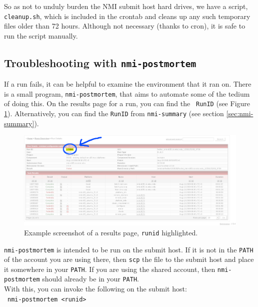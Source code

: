 So as not to unduly burden the NMI submit host hard drives, we have a script,
{\tt cleanup.sh}, which is included in the crontab and cleans up any such
temporary files older than 72 hours.  Although not necessary (thanks to cron),
it is safe to run the script manually.


\subsection{Troubleshooting with {\tt nmi-postmortem}}

If a run fails, it can be helpful to examine the environment that it ran on.
There is a small program, {\tt nmi-postmortem}, that aims to automate some of
the tedium of doing this.  On the results page for a run, you can find the {\tt
RunID} (see Figure \ref{fig:nmi:screenshot}).  Alternatively, you can find the
{\tt RunID} from {\tt nmi-summary} (see section \ref{sec:nmi-summary}).\\


\begin{figure}
	\includegraphics[width=200mm]{nmi-screenshot.png}

	\caption{Example screenshot of a results page, {\tt runid} highlighted.}
	\label{fig:nmi:screenshot}
\end{figure}


{\tt nmi-postmortem} is intended to be run on the submit host.  If it is not in
the {\tt PATH} of the account you are using there, then {\tt scp} the file to
the submit host and place it somewhere in your {\tt PATH}.  If you are using the
shared account, then {\tt nmi-postmortem} should already be in your {\tt PATH}.\\


With this, you can invoke the following on the submit host:\\
\ {\tt nmi-postmortem <runid>}\\



